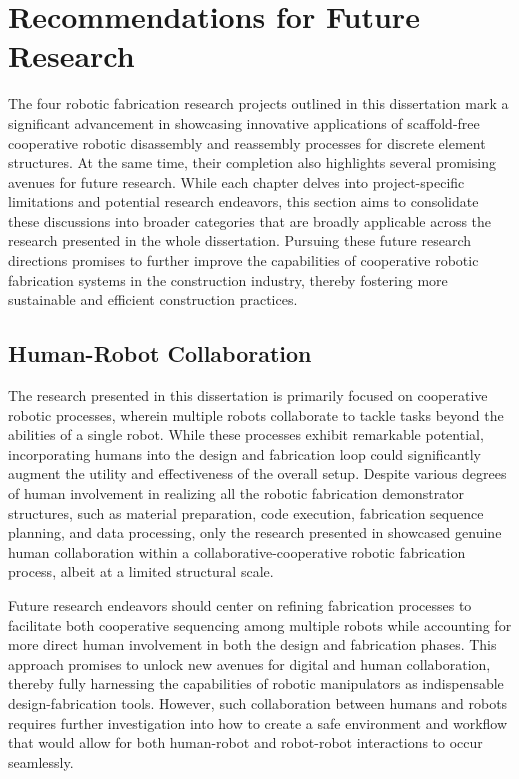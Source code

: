 \section{Recommendations for Future Research} \label{sec:03_04_future}
    The four robotic fabrication research projects outlined in this dissertation mark a significant advancement in showcasing innovative applications of scaffold-free cooperative robotic disassembly and reassembly processes for discrete element structures. At the same time, their completion also highlights several promising avenues for future research. While each chapter delves into project-specific limitations and potential research endeavors, this section aims to consolidate these discussions into broader categories that are broadly applicable across the research presented in the whole dissertation. Pursuing these future research directions promises to further improve the capabilities of cooperative robotic fabrication systems in the construction industry, thereby fostering more sustainable and efficient construction practices.

    \subsection{Human-Robot Collaboration}
        The research presented in this dissertation is primarily focused on cooperative robotic processes, wherein multiple robots collaborate to tackle tasks beyond the abilities of a single robot. While these processes exhibit remarkable potential, incorporating humans into the design and fabrication loop could significantly augment the utility and effectiveness of the overall setup. Despite various degrees of human involvement in realizing all the robotic fabrication demonstrator structures, such as material preparation, code execution, fabrication sequence planning, and data processing, only the research presented in  showcased genuine human collaboration within a collaborative-cooperative robotic fabrication process, albeit at a limited structural scale.

        Future research endeavors should center on refining fabrication processes to facilitate both cooperative sequencing among multiple robots while accounting for more direct human involvement in both the design and fabrication phases. This approach promises to unlock new avenues for digital and human collaboration, thereby fully harnessing the capabilities of robotic manipulators as indispensable design-fabrication tools. However, such collaboration between humans and robots requires further investigation into how to create a safe environment and workflow that would allow for both human-robot and robot-robot interactions to occur seamlessly.

